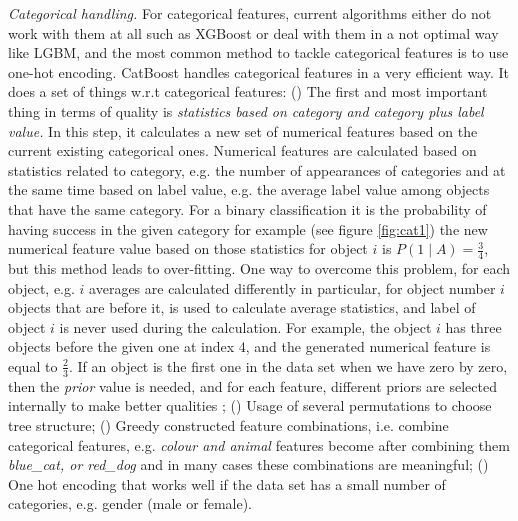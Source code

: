 \textit{Categorical handling.} For categorical features, current algorithms either do not work with them at all such as XGBoost or deal with them in a not optimal way like LGBM, and the most common method to tackle categorical features is to use one-hot encoding. CatBoost handles categorical features in a very efficient way. It does a set of things w.r.t categorical features: () The first and most important thing in terms of quality is \textit{statistics based on category and category plus label value.} In this step, it calculates a new set of numerical features based on the current existing categorical ones. Numerical features are calculated based on statistics related to category, e.g. the number of appearances of categories and at the same time based on label value, e.g. the average label value among objects that have the same category. For a binary classification it is the probability of having success in the given category for example (see figure \ref{fig:cat1}) the new numerical feature value based on those statistics for object $i$ is $P(1 \mid A) = \frac{3}{4}$, but this method leads to over-fitting. One way to overcome this problem, for each object, e.g. $i$ averages are calculated differently in particular, for object number $i$ objects that are before it, is used to calculate average statistics, and label of object $i$ is never used during the calculation. For example, the object $i$ has three objects before the given one at index $4$, and the generated numerical feature is equal to $\frac{2}{3}$.  If an object is the first one in the data set when we have zero by zero, then the \textit{prior} value is needed, and for each feature, different priors are selected internally to make better qualities \cite{prokhorenkova2018catboost}; () Usage of several permutations to choose tree structure; () Greedy constructed feature combinations, i.e. combine categorical features, e.g. \textit{colour and animal} features become after combining them \textit{blue\_cat, or red\_dog} and in many cases these combinations are meaningful; () One hot encoding that works well if the data set has a small number of categories, e.g. gender (male or female).

